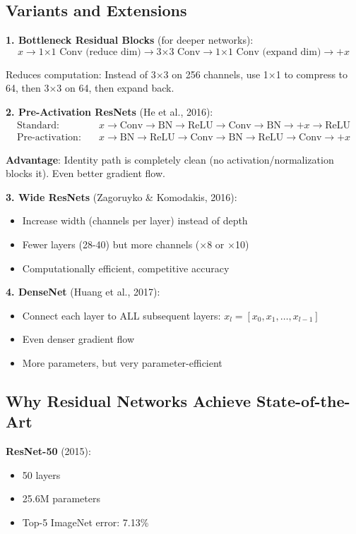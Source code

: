 \documentclass[11pt,oneside]{book}
\begin{document}
\subsection{Variants and Extensions}

\textbf{1. Bottleneck Residual Blocks} (for deeper networks):
\[
x \to \text{1×1 Conv (reduce dim)} \to \text{3×3 Conv} \to \text{1×1 Conv (expand dim)} \to + x
\]

Reduces computation: Instead of 3×3 on 256 channels, use 1×1 to compress to 64, then 3×3 on 64, then expand back.

\textbf{2. Pre-Activation ResNets} (He et al., 2016):
\begin{align*}
\text{Standard:} \quad & x \to \text{Conv} \to \text{BN} \to \text{ReLU} \to \text{Conv} \to \text{BN} \to +x \to \text{ReLU} \\
\text{Pre-activation:} \quad & x \to \text{BN} \to \text{ReLU} \to \text{Conv} \to \text{BN} \to \text{ReLU} \to \text{Conv} \to +x
\end{align*}

\textbf{Advantage}: Identity path is completely clean (no activation/normalization blocks it). Even better gradient flow.

\textbf{3. Wide ResNets} (Zagoruyko \& Komodakis, 2016):
\begin{itemize}
\item Increase width (channels per layer) instead of depth
\item Fewer layers (28-40) but more channels ($\times$8 or $\times$10)
\item Computationally efficient, competitive accuracy
\end{itemize}

\textbf{4. DenseNet} (Huang et al., 2017):
\begin{itemize}
\item Connect each layer to ALL subsequent layers: $x_l = [x_0, x_1, \ldots, x_{l-1}]$
\item Even denser gradient flow
\item More parameters, but very parameter-efficient
\end{itemize}

\subsection{Why Residual Networks Achieve State-of-the-Art}

\textbf{ResNet-50} (2015):
\begin{itemize}
\item 50 layers
\item 25.6M parameters
\item Top-5 ImageNet error: 7.13\%
\end{itemize}
\end{document}

